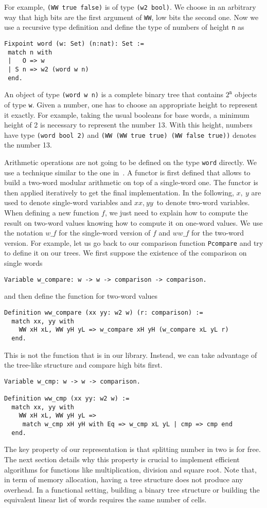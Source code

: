 For example, {\tt (WW true false)} is of type {\tt (w2 bool)}.
We choose in an arbitrary way  that high bits are the first argument of {\tt WW}, low bits
the second one. Now we use a recursive type definition and define
the type of numbers of height {\tt n} as
\begin{verbatim}
Fixpoint word (w: Set) (n:nat): Set :=
 match n with
 |   O => w
 | S n => w2 (word w n)
 end.
\end{verbatim}
An object of type {\tt (word w n)} is a complete binary tree that
contains $2^\texttt{n}$ objects of type {\tt w}. Given a number,
one has to choose an appropriate height to represent it exactly.
For example, taking the usual booleans for base words, a minimum
height of 2 is necessary to represent the number 13. With this height, 
numbers have type {\tt (word bool 2)} and 
{\tt (WW (WW true true) (WW false true))} denotes the number 13.

Arithmetic operations are not going to be defined on the type {\tt word} directly.
We use a technique similar to the one in~\cite{GreMa}. A functor is first defined that 
allows to build a two-word modular arithmetic on top of a single-word one.
The functor is then applied iteratively to get the final implementation.
In the following, $x,\ y$ are used to denote single-word variables and $\textit{xx},\ \textit{yy}$ 
to denote two-word variables. 
When defining a new function $f$, we just need to explain how to compute the 
result on two-word values knowing how to compute it on one-word values.
We use the notation $w\_f$ for the single-word version of $f$ and 
$\textit{ww}\_f$ for the two-word version.
For example, let us go back to our comparison function {\tt Pcompare}
and try to define it on our trees. We first suppose the existence
of the comparison on single words
\begin{verbatim}
Variable w_compare: w -> w -> comparison -> comparison.
\end{verbatim}
and then define the function for two-word values
\begin{verbatim}
Definition ww_compare (xx yy: w2 w) (r: comparison) :=
  match xx, yy with
    WW xH xL, WW yH yL => w_compare xH yH (w_compare xL yL r) 
  end.
\end{verbatim}
This is not the function that is in our library. Instead, we can take 
advantage of the tree-like structure and compare high bits first.  
\begin{verbatim}
Variable w_cmp: w -> w -> comparison.

Definition ww_cmp (xx yy: w2 w) :=
  match xx, yy with
    WW xH xL, WW yH yL => 
     match w_cmp xH yH with Eq => w_cmp xL yL | cmp => cmp end
  end. 
\end{verbatim}
The key property of our representation is that splitting number in two
is for free. The next section details why this property is crucial to implement efficient
algorithms for functions like multiplication, division and square root.
Note that, in term of memory allocation, having a tree structure
does not produce any overhead. In a functional setting, building a binary 
tree structure or building the equivalent linear list of words requires the same number of cells.

